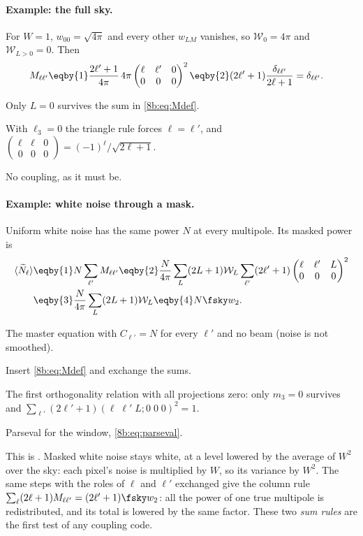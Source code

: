 \paragraph{Example: the full sky.}
For $W=1$, $w_{00}=\sqrt{4\pi}$ and every other $w_{LM}$ vanishes, so $\mathcal W_0=4\pi$ and
$\mathcal W_{L>0}=0$. Then
\begin{align*}
  M_{\ell\ell'}
  &\eqby{1}\frac{2\ell'+1}{4\pi}\,4\pi\begin{pmatrix}\ell&\ell'&0\\0&0&0\end{pmatrix}^2
   \eqby{2}(2\ell'+1)\frac{\delta_{\ell\ell'}}{2\ell+1}=\delta_{\ell\ell'} .
\end{align*}
\begin{explain}
  \item Only $L=0$ survives the sum in \eqref{8b:eq:Mdef}.
  \item With $\ell_3=0$ the triangle rule forces $\ell=\ell'$, and
        $\begin{pmatrix}\ell&\ell&0\\0&0&0\end{pmatrix}=(-1)^\ell/\sqrt{2\ell+1}$.
\end{explain}
No coupling, as it must be.

\paragraph{Example: white noise through a mask.}
Uniform white noise has the same power $N$ at every multipole. Its masked power is
\begin{align}
  \langle\widetilde N_\ell\rangle
  &\eqby{1}N\sum_{\ell'}M_{\ell\ell'}
   \eqby{2}\frac N{4\pi}\sum_L(2L+1)\mathcal W_L\sum_{\ell'}(2\ell'+1)\begin{pmatrix}\ell&\ell'&L\\0&0&0\end{pmatrix}^2
   \nonumber\\
  &\eqby{3}\frac N{4\pi}\sum_L(2L+1)\mathcal W_L
   \eqby{4}N\fsky w_2 .
  \label{8b:eq:white}
\end{align}
\begin{explain}
  \item The master equation with $C_{\ell'}=N$ for every $\ell'$ and no beam (noise is not smoothed).
  \item Insert \eqref{8b:eq:Mdef} and exchange the sums.
  \item The first orthogonality relation with all projections zero: only $m_3=0$ survives and
        $\sum_{\ell'}(2\ell'+1)(\ell\;\ell'\;L;0\;0\;0)^2=1$.
  \item Parseval for the window, \eqref{8b:eq:parseval}.
\end{explain}
This is . Masked white noise stays white, at a level lowered by the average
of $W^2$ over the sky: each pixel's noise is multiplied by $W$, so its variance by $W^2$. The same
steps with the roles of $\ell$ and $\ell'$ exchanged give the column rule
$\sum_\ell(2\ell+1)M_{\ell\ell'}=(2\ell'+1)\fsky w_2$: all the power of one true multipole is
redistributed, and its total is lowered by the same factor. These two \emph{sum rules} are the
first test of any coupling code.


